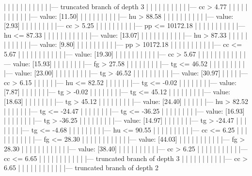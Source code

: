 \documentclass[UTF8, a4paper]{ctexart}
\begin{document}
|   |   |   |   |   |   |   |   |   |   |   |--- truncated branch of depth 3
|   |   |   |   |   |   |   |   |   |   |--- cc >  4.77
|   |   |   |   |   |   |   |   |   |   |   |--- value: [11.50]
|   |   |   |   |   |   |   |   |   |--- hu >  88.58
|   |   |   |   |   |   |   |   |   |   |--- value: [2.93]
|   |   |   |   |   |   |   |   |--- cc >  5.25
|   |   |   |   |   |   |   |   |   |--- pp <= 10172.18
|   |   |   |   |   |   |   |   |   |   |--- hu <= 87.33
|   |   |   |   |   |   |   |   |   |   |   |--- value: [13.07]
|   |   |   |   |   |   |   |   |   |   |--- hu >  87.33
|   |   |   |   |   |   |   |   |   |   |   |--- value: [9.80]
|   |   |   |   |   |   |   |   |   |--- pp >  10172.18
|   |   |   |   |   |   |   |   |   |   |--- cc <= 5.67
|   |   |   |   |   |   |   |   |   |   |   |--- value: [19.30]
|   |   |   |   |   |   |   |   |   |   |--- cc >  5.67
|   |   |   |   |   |   |   |   |   |   |   |--- value: [15.93]
|   |   |   |   |   |   |   |--- fg >  27.58
|   |   |   |   |   |   |   |   |--- tg <= 46.52
|   |   |   |   |   |   |   |   |   |--- value: [23.00]
|   |   |   |   |   |   |   |   |--- tg >  46.52
|   |   |   |   |   |   |   |   |   |--- value: [30.97]
|   |   |   |   |--- cc >  6.15
|   |   |   |   |   |--- hu <= 82.52
|   |   |   |   |   |   |--- tg <= -0.02
|   |   |   |   |   |   |   |--- value: [7.87]
|   |   |   |   |   |   |--- tg >  -0.02
|   |   |   |   |   |   |   |--- tg <= 45.12
|   |   |   |   |   |   |   |   |--- value: [18.63]
|   |   |   |   |   |   |   |--- tg >  45.12
|   |   |   |   |   |   |   |   |--- value: [24.40]
|   |   |   |   |   |--- hu >  82.52
|   |   |   |   |   |   |--- tg <= -24.47
|   |   |   |   |   |   |   |--- tg <= -36.25
|   |   |   |   |   |   |   |   |--- value: [16.93]
|   |   |   |   |   |   |   |--- tg >  -36.25
|   |   |   |   |   |   |   |   |--- value: [14.97]
|   |   |   |   |   |   |--- tg >  -24.47
|   |   |   |   |   |   |   |--- tg <= -4.68
|   |   |   |   |   |   |   |   |--- hu <= 90.55
|   |   |   |   |   |   |   |   |   |--- cc <= 6.25
|   |   |   |   |   |   |   |   |   |   |--- fg <= 28.30
|   |   |   |   |   |   |   |   |   |   |   |--- value: [44.03]
|   |   |   |   |   |   |   |   |   |   |--- fg >  28.30
|   |   |   |   |   |   |   |   |   |   |   |--- value: [38.40]
|   |   |   |   |   |   |   |   |   |--- cc >  6.25
|   |   |   |   |   |   |   |   |   |   |--- cc <= 6.65
|   |   |   |   |   |   |   |   |   |   |   |--- truncated branch of depth 3
|   |   |   |   |   |   |   |   |   |   |--- cc >  6.65
|   |   |   |   |   |   |   |   |   |   |   |--- truncated branch of depth 2
\end{document}
